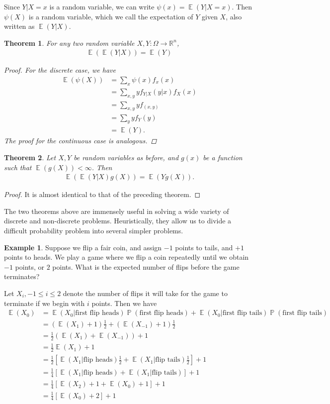 \documentclass[12pt]{article}
\newcommand{\rr}{\mathbb{R}}
\DeclareMathOperator{\ex}{\mathbb{E}}
\DeclareMathOperator{\prob}{\mathbb{P}}
\theoremstyle{plain}
\newtheorem{theorem}{Theorem}
\theoremstyle{definition}
\newtheorem*{example}{Example}
\theoremstyle{remark}
\numberwithin{equation}{section}  %
\begin{document}
Since $Y|X =x$ is a random variable, we can write $\psi(x) = \ex(Y | X =x)$.
Then $\psi(X)$ is a random variable, which we call the expectation of $Y$ given
$X$, also written as $\ex(Y|X)$.
\begin{theorem}
	For any two random variable $X,Y: \Omega \to \rr^n$,
	\begin{align*}
		\ex(\ex(Y | X)) = \ex(Y)
	\end{align*}
	\begin{proof}
		For the discrete case, we have
		\begin{align*}
			\ex(\psi(X)) 
			& = \sum_{x} \psi(x) f_x(x)
			\\
			& = \sum_{x,y} y f_{Y|X}(y|x) f_X(x)
			\\
			& = \sum_{x,y} y f_{(x,y)}
			\\
			& = \sum_y y f_Y(y)
			\\
			& = \ex(Y).
		\end{align*}
		The proof for the continuous case is analogous. 
	\end{proof}
\end{theorem}
\begin{theorem}
	Let $X,Y$ be random variables as before, and $g(x)$ be a function such that
	$\ex(g(X))< \infty$. Then
	\begin{align*}
		\ex(\ex(Y|X)g(X)) = \ex(Yg(X)).
	\end{align*}
\end{theorem}
\begin{proof}
	It is almost identical to that of the preceding theorem.
\end{proof}
The two theorems above are immensely useful in solving a wide variety of
discrete and non-discrete problems. Heuristically, they allow us to divide a
difficult probability problem into several simpler problems.
\begin{example}
	Suppose we flip a fair coin, and assign $-1$ points to tails, and $+1$ 
	points to
	heads. We play a game where we flip a coin repeatedly until we obtain
	$-1$ points, or $2$ points. What is the expected number of flips before the
	game terminates? 
\end{example}
Let $X_i, -1 \le i \le 2$ denote the number of flips it will take for the game
to terminate if we begin with $i$ points. Then we have
\begin{align*}
	\ex(X_0) & = \ex(X_0 | \text{first flip heads})\prob(\text{first flip heads}) +
	\ex(X_0 | \text{first flip tails}) \prob(\text{first flip tails})
	\\
	& = (\ex(X_1) + 1) \frac{1}{2} + (\ex(X_{-1}) + 1) \frac{1}{2}
	\\
	& = \frac{1}{2}(\ex(X_1) + \ex(X_{-1})) + 1
	\\
	& = \frac{1}{2}\ex(X_1) + 1
	\\
	& = \frac{1}{2}[\ex(X_1 | \text{flip heads}) \frac{1}{2} + \ex(X_1 | \text{flip
	tails}) \frac{1}{2}] + 1
	\\
	& = \frac{1}{4}[\ex(X_1 | \text{flip heads}) + \ex(X_1 | \text{flip
	tails})] + 1
	\\
	& = \frac{1}{4} [ \ex(X_2) + 1  + \ex(X_0) + 1] + 1
	\\
	& = \frac{1}{4}[ \ex(X_0) + 2] + 1
\end{align*}
\end{document}
